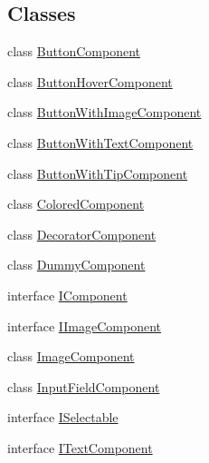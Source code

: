 \subsection*{Classes}
\begin{DoxyCompactItemize}
\item 
class \hyperlink{class_unity_engine_1_1_u_i_1_1_windows_1_1_components_1_1_button_component}{Button\+Component}
\item 
class \hyperlink{class_unity_engine_1_1_u_i_1_1_windows_1_1_components_1_1_button_hover_component}{Button\+Hover\+Component}
\item 
class \hyperlink{class_unity_engine_1_1_u_i_1_1_windows_1_1_components_1_1_button_with_image_component}{Button\+With\+Image\+Component}
\item 
class \hyperlink{class_unity_engine_1_1_u_i_1_1_windows_1_1_components_1_1_button_with_text_component}{Button\+With\+Text\+Component}
\item 
class \hyperlink{class_unity_engine_1_1_u_i_1_1_windows_1_1_components_1_1_button_with_tip_component}{Button\+With\+Tip\+Component}
\item 
class \hyperlink{class_unity_engine_1_1_u_i_1_1_windows_1_1_components_1_1_colored_component}{Colored\+Component}
\item 
class \hyperlink{class_unity_engine_1_1_u_i_1_1_windows_1_1_components_1_1_decorator_component}{Decorator\+Component}
\item 
class \hyperlink{class_unity_engine_1_1_u_i_1_1_windows_1_1_components_1_1_dummy_component}{Dummy\+Component}
\item 
interface \hyperlink{interface_unity_engine_1_1_u_i_1_1_windows_1_1_components_1_1_i_component}{I\+Component}
\item 
interface \hyperlink{interface_unity_engine_1_1_u_i_1_1_windows_1_1_components_1_1_i_image_component}{I\+Image\+Component}
\item 
class \hyperlink{class_unity_engine_1_1_u_i_1_1_windows_1_1_components_1_1_image_component}{Image\+Component}
\item 
class \hyperlink{class_unity_engine_1_1_u_i_1_1_windows_1_1_components_1_1_input_field_component}{Input\+Field\+Component}
\item 
interface \hyperlink{interface_unity_engine_1_1_u_i_1_1_windows_1_1_components_1_1_i_selectable}{I\+Selectable}
\item 
interface \hyperlink{interface_unity_engine_1_1_u_i_1_1_windows_1_1_components_1_1_i_text_component}{I\+Text\+Component}
\item 

\end{DoxyCompactItemize}
